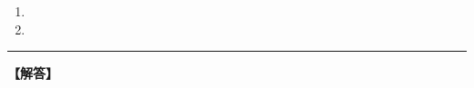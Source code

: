 \openKaiFile
    \begin{enumerate}[1.\ ]
        \item {}
        \item {}
    \end{enumerate}
\closeKaiFile
    \vfill
    \hrule
    \begin{center}\textbf{【解答】}\end{center}
    \small
{}

